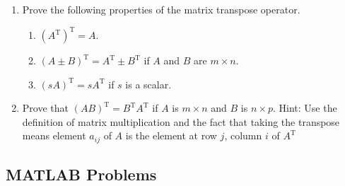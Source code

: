 \documentclass[../main.tex]{subfiles}
\begin{document}
\begin{enumerate}[label=\textbf{1.\arabic*}]
\item Prove the following properties of the matrix transpose operator.

	\begin{enumerate}[label = \textbf{\alph*.}]
		\item $\left(A^{\mathrm{T}}\right)^{\mathrm{T}}=A .$
		\item $(A \pm B)^{\mathrm{T}}=A^{\mathrm{T}} \pm B^{\mathrm{T}}$ if $A$ and $B$ are $m \times n .$
		\item $(s A)^{\mathrm{T}}=s A^{\mathrm{T}}$ if $s$ is a scalar.
	\end{enumerate}

\item Prove that $(A B)^{\mathrm{T}}=B^{\mathrm{T}} A^{\mathrm{T}}$ if $A$ is $m \times n$ and $B$ is $n \times p .$ Hint: Use the definition of matrix multiplication and the fact that taking the transpose means element $a_{i j}$ of $A$ is the element at row $j$, column $i$ of $A^{\mathrm{T}}$

\end{enumerate}

\subsection{MATLAB Problems}
\end{document}
